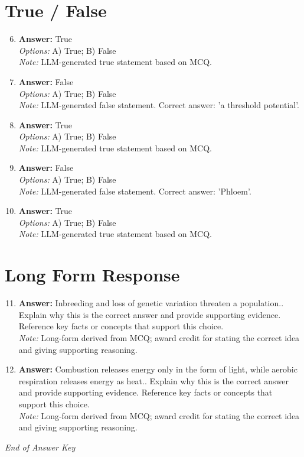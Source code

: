 \documentclass[12pt]{article}
\begin{document}
\section*{True / False}
\begin{enumerate}[label=\arabic*.]
\setcounter{enumi}{5}
\item \textbf{Answer:} True
\\ \textit{Options:} A) True; B) False
\\ \textit{Note:} LLM-generated true statement based on MCQ.
\item \textbf{Answer:} False
\\ \textit{Options:} A) True; B) False
\\ \textit{Note:} LLM-generated false statement. Correct answer: 'a threshold potential'.
\item \textbf{Answer:} True
\\ \textit{Options:} A) True; B) False
\\ \textit{Note:} LLM-generated true statement based on MCQ.
\item \textbf{Answer:} False
\\ \textit{Options:} A) True; B) False
\\ \textit{Note:} LLM-generated false statement. Correct answer: 'Phloem'.
\item \textbf{Answer:} True
\\ \textit{Options:} A) True; B) False
\\ \textit{Note:} LLM-generated true statement based on MCQ.
\end{enumerate}

\section*{Long Form Response}
\begin{enumerate}[label=\arabic*.]
\setcounter{enumi}{10}
\item \textbf{Answer:} Inbreeding and loss of genetic variation threaten a population.. Explain why this is the correct answer and provide supporting evidence. Reference key facts or concepts that support this choice.
\\ \textit{Note:} Long-form derived from MCQ; award credit for stating the correct idea and giving supporting reasoning.
\item \textbf{Answer:} Combustion releases energy only in the form of light, while aerobic respiration releases energy as heat.. Explain why this is the correct answer and provide supporting evidence. Reference key facts or concepts that support this choice.
\\ \textit{Note:} Long-form derived from MCQ; award credit for stating the correct idea and giving supporting reasoning.
\end{enumerate}

\vfill
\noindent\textit{End of Answer Key}
\end{document}

